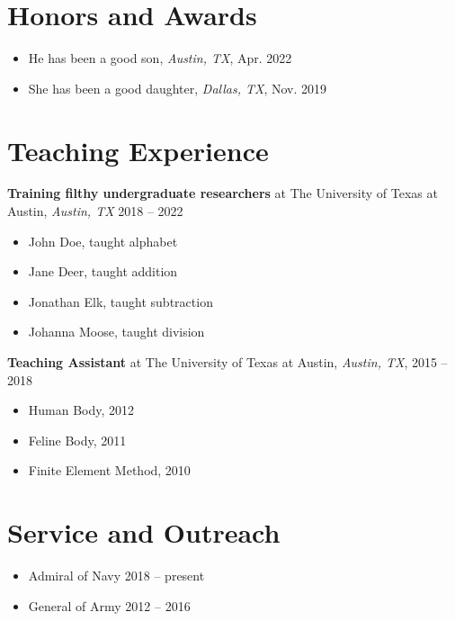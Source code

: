 \section*{\textcolor{Burnt Orange}{Honors and Awards}\hrulefill}
\vspace{-2.4mm}
\begin{itemize}
	\item He has been a good son, \textit{Austin, TX}, \hfill Apr. 2022
	\item She has been a good daughter, \textit{Dallas, TX}, \hfill Nov. 2019
\end{itemize}
\vspace{-3mm}

\section*{\textcolor{Burnt Orange}{Teaching Experience}\hrulefill}
\vspace{-2.4mm}
\textbf{Training filthy undergraduate researchers} at The University of Texas at Austin, \textit{Austin, TX} \hfill 2018 -- 2022
\begin{itemize}
	\item John Doe, taught alphabet
	\item Jane Deer, taught addition
	\item Jonathan Elk, taught subtraction
	\item Johanna Moose, taught division
\end{itemize}
\vspace{3pt}
\textbf{Teaching Assistant} at The University of Texas at Austin, \textit{Austin, TX}, \hfill 2015 -- 2018
\begin{itemize}
	\item Human Body, 2012
	\item Feline Body, 2011
	\item Finite Element Method, 2010
\end{itemize}
\vspace{-3mm}

\section*{\textcolor{Burnt Orange}{Service and Outreach}\hrulefill}
\vspace{-2.4mm}
\begin{itemize}
	\item Admiral of Navy \hfill 2018 -- present
	\item General of Army \hfill 2012 -- 2016
\end{itemize}
\vspace{-3mm}
